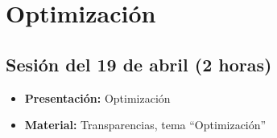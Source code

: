 \documentclass[a4paper,12pt]{report}
\begin{document}
\section{Optimización}

\subsection{Sesión del 19 de abril (2 horas)}

\begin{itemize}
 \item \textbf{Presentación:} Optimización
 \item \textbf{Material:} Transparencias, tema ``Optimización''
\end{itemize}






\end{document}

